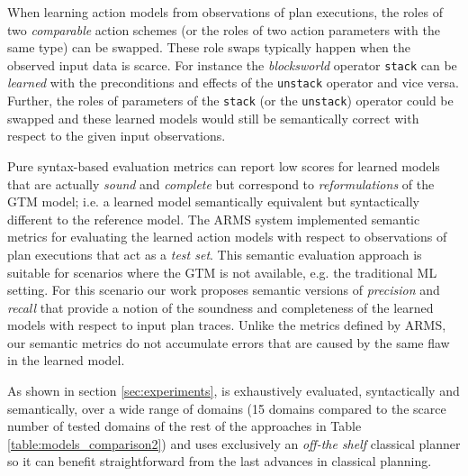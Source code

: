 When learning action models from observations of plan executions, the roles of two {\em comparable} action schemes (or the roles of two action parameters with the same type) can be swapped. These role swaps typically happen when the observed input data is scarce. For instance the {\em blocksworld} operator {\small\tt stack} can be {\em learned} with the preconditions and effects of the {\small\tt unstack} operator and vice versa. Further, the roles of parameters of the {\small\tt stack} (or the {\small\tt unstack}) operator could be swapped and these learned models would still be semantically correct with respect to the given input observations.

Pure syntax-based evaluation metrics can report low scores for learned models that are actually {\em sound} and {\em complete} but correspond to {\em reformulations} of the GTM model; i.e. a learned model semantically equivalent but syntactically different to the reference model. The ARMS system implemented semantic metrics for evaluating the learned action models with respect to observations of plan executions that act as a {\em test set}. This semantic evaluation approach is suitable for scenarios where the GTM is not available, e.g. the traditional ML setting. For this scenario our work proposes semantic versions of {\em precision} and {\em recall} that provide a notion of the soundness and completeness of the learned models with respect to input plan traces. Unlike the metrics defined by ARMS, our semantic metrics do not accumulate errors that are caused by the same flaw in the learned model. 

As shown in section \ref{sec:experiments}, \FAMA is exhaustively evaluated, syntactically and semantically, over a wide range of domains (15 domains compared to the scarce number of tested domains of the rest of the approaches in Table \ref{table:models_comparison2}) and uses exclusively an \emph{off-the shelf} classical planner so it can benefit straightforward from the last advances in classical planning.

